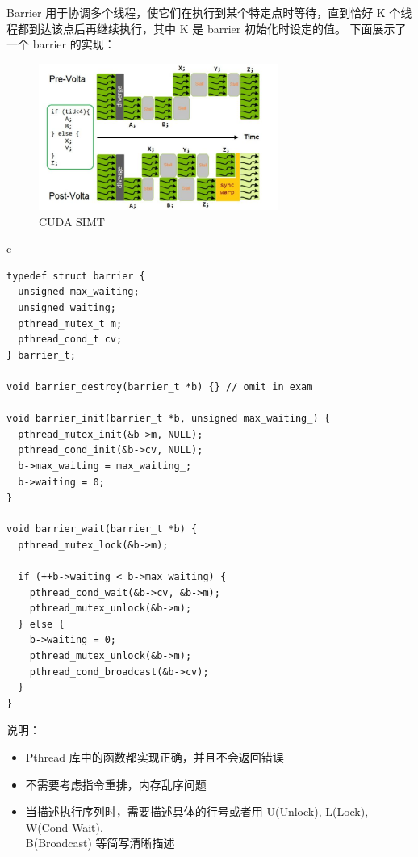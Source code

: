 \documentclass[a4paper,12pt]{article}
\begin{document}
Barrier 用于协调多个线程，使它们在执行到某个特定点时等待，直到恰好 K 个线程都到达该点后再继续执行，其中 K 是 barrier 初始化时设定的值。
下面展示了一个 barrier 的实现：

\begin{figure}[!htb]
  \centering
  \includegraphics[width=0.7\textwidth]{img/simt.png}
  \caption{CUDA SIMT}
\end{figure}

\begin{table}[htb]
  \centering
  \begin{tabular}{c}
    \begin{lstlisting}
typedef struct barrier {
  unsigned max_waiting;
  unsigned waiting;
  pthread_mutex_t m;
  pthread_cond_t cv;
} barrier_t;

void barrier_destroy(barrier_t *b) {} // omit in exam

void barrier_init(barrier_t *b, unsigned max_waiting_) {
  pthread_mutex_init(&b->m, NULL);
  pthread_cond_init(&b->cv, NULL);
  b->max_waiting = max_waiting_;
  b->waiting = 0;
}

void barrier_wait(barrier_t *b) {
  pthread_mutex_lock(&b->m);

  if (++b->waiting < b->max_waiting) {
    pthread_cond_wait(&b->cv, &b->m);
    pthread_mutex_unlock(&b->m);
  } else {
    b->waiting = 0;
    pthread_mutex_unlock(&b->m);
    pthread_cond_broadcast(&b->cv);
  }
}
    \end{lstlisting}
  \end{tabular}
\end{table}



说明：

\begin{itemize}
  \item Pthread 库中的函数都实现正确，并且不会返回错误
  \item 不需要考虑指令重排，内存乱序问题
  \item 当描述执行序列时，需要描述具体的行号或者用 U(Unlock), L(Lock), W(Cond Wait), \\
        B(Broadcast) 等简写清晰描述
\end{itemize}
\end{document}
